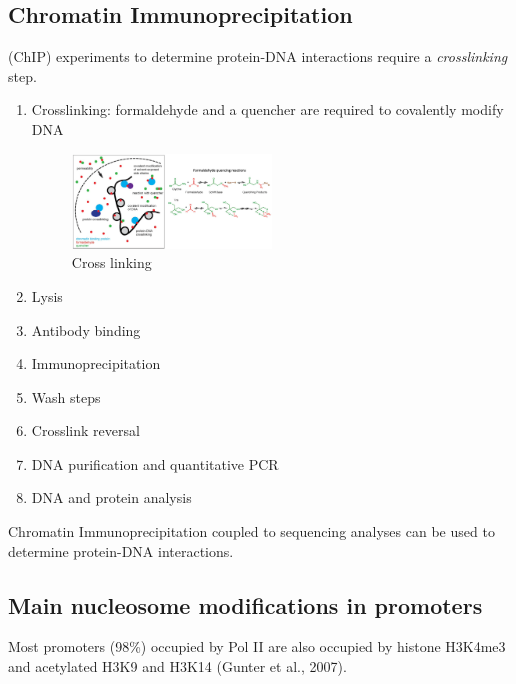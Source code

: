 \subsection{Chromatin Immunoprecipitation} 
(ChIP) experiments to determine protein-DNA interactions require a \emph{crosslinking} step.

\begin{enumerate}
\tightlist
\item
  Crosslinking: formaldehyde and a quencher are required to covalently modify DNA

\begin{figure}
\centering
\includegraphics[width=0.5\textwidth]{../_resources/Screenshot_2022-09-22_at_21-36-39.png}
\caption{Cross linking}
\end{figure}

\item
  Lysis
\item
  Antibody binding
\item
  Immunoprecipitation
\item
  Wash steps
\item
  Crosslink reversal
\item
  DNA purification and quantitative PCR
\item
  DNA and protein analysis
\end{enumerate}
 Chromatin Immunoprecipitation coupled to sequencing analyses can be used to determine protein-DNA interactions.
 
\hypertarget{main-nucleosome-modifications-in-promoters}{%
\subsection{Main nucleosome modifications in promoters}\label{main-nucleosome-modifications-in-promoters}}

Most promoters (98\%) occupied by Pol II are also occupied by histone H3K4me3 and acetylated H3K9 and H3K14 (Gunter et al., 2007).

